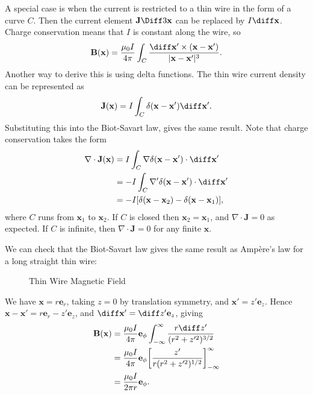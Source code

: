 \documentclass[12pt]{article}
\begin{document}
A special case is when the current is restricted to a thin wire in the form of a curve $C$. Then the current element $\mathbf{J} \Diff3 \mathbf{x}$ can be replaced by $I \diff \mathbf{x}$. Charge conservation means that $I$ is constant along the wire, so
\[
\mathbf{B}(\mathbf{x}) = \frac{\mu_0 I}{4 \pi} \int_{C} \frac{\diff \mathbf{x}' \times (\mathbf{x} - \mathbf{x}')}{|\mathbf{x} - \mathbf{x}'|^3}
.\]
Another way to derive this is using delta functions. The thin wire current density can be represented as
\[
\mathbf{J}(\mathbf{x}) = I \int_{C} \delta(\mathbf{x} - \mathbf{x}') \diff \mathbf{x}'
.\]
Substituting this into the Biot-Savart law, gives the same result. Note that charge conservation takes the form
\begin{align*}
	\nabla \cdot \mathbf{J}(\mathbf{x}) &= I \int_{C} \nabla \delta(\mathbf{x} - \mathbf{x}') \cdot \diff \mathbf{x}' \\
					    &= -I \int_{C} \nabla' \delta(\mathbf{x} - \mathbf{x}') \cdot \diff \mathbf{x}' \\
					    &= -I [\delta(\mathbf{x} - \mathbf{x}_2) - \delta(\mathbf{x} - \mathbf{x}_1)],
\end{align*}
where $C$ runs from $\mathbf{x}_1$ to $\mathbf{x}_2$. If $C$ is closed then $\mathbf{x}_2 = \mathbf{x}_1$, and $\nabla \cdot \mathbf{J} = 0$ as expected. If $C$ is infinite, then $\nabla \cdot \mathbf{J} = 0$ for any finite $\mathbf{x}$.

We can check that the Biot-Savart law gives the same result as Amp\`{e}re's law for a long straight thin wire:

\begin{figure}[h]
	\centering
	\caption{Thin Wire Magnetic Field}
	\label{fig:twmf}
\end{figure}

We have $\mathbf{x} = r \mathbf{e}_r$, taking $z = 0$ by translation symmetry, and $\mathbf{x}' = z' \mathbf{e}_z$. Hence $\mathbf{x} - \mathbf{x}' = r \mathbf{e}_r - z' \mathbf{e}_z$, and $\diff \mathbf{x}' = \diff z' \mathbf{e}_z$, giving
\begin{align*}
	\mathbf{B}(\mathbf{x}) &= \frac{\mu_0 I}{4 \pi} \mathbf{e}_{\phi} \int_{-\infty}^{\infty} \frac{r \diff z'}{(r^2 + z'^2)^{3/2}} \\
			       &= \frac{\mu_0 I}{4 \pi} \mathbf{e}_{\phi} \biggl[ \frac{z'}{r(r^2 + z'^2)^{1/2}} \biggr]_{-\infty}^{\infty} \\
			       &= \frac{\mu_0 I}{2 \pi r} \mathbf{e}_{\phi}.
\end{align*} 
\end{document}
